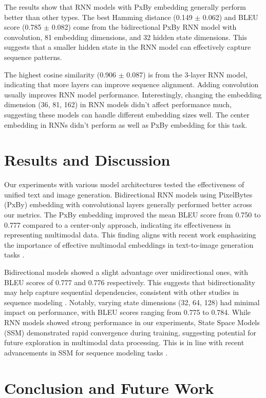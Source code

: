 \documentclass[10pt,a4paper]{article}
\begin{document}
The results show that RNN models with PxBy embedding generally perform better than other types. The best Hamming distance (0.149 $\pm$ 0.062) and BLEU score (0.785 $\pm$ 0.082) come from the bidirectional PxBy RNN model with convolution, 81 embedding dimensions, and 32 hidden state dimensions. This suggests that a smaller hidden state in the RNN model can effectively capture sequence patterns.

The highest cosine similarity (0.906 $\pm$ 0.087) is from the 3-layer RNN model, indicating that more layers can improve sequence alignment. Adding convolution usually improves RNN model performance. Interestingly, changing the embedding dimension (36, 81, 162) in RNN models didn't affect performance much, suggesting these models can handle different embedding sizes well. The center embedding in RNNs didn't perform as well as PxBy embedding for this task.

\section{Results and Discussion}

Our experiments with various model architectures tested the effectiveness of unified text and image generation. Bidirectional RNN models using PixelBytes (PxBy) embedding with convolutional layers generally performed better across our metrics. The PxBy embedding improved the mean BLEU score from 0.750 to 0.777 compared to a center-only approach, indicating its effectiveness in representing multimodal data. This finding aligns with recent work emphasizing the importance of effective multimodal embeddings in text-to-image generation tasks \cite{verHo2021efficient}.

Bidirectional models showed a slight advantage over unidirectional ones, with BLEU scores of 0.777 and 0.776 respectively. This suggests that bidirectionality may help capture sequential dependencies, consistent with other studies in sequence modeling \cite{schuster1997bidirectional}. Notably, varying state dimensions (32, 64, 128) had minimal impact on performance, with BLEU scores ranging from 0.775 to 0.784. While RNN models showed strong performance in our experiments, State Space Models (SSM) demonstrated rapid convergence during training, suggesting potential for future exploration in multimodal data processing. This is in line with recent advancements in SSM for sequence modeling tasks \cite{dao2024transformers}.

\section{Conclusion and Future Work}
\end{document}
